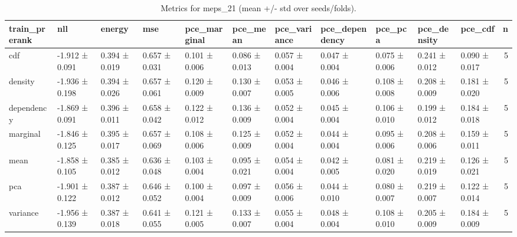 \begin{table}
\caption{Metrics for meps_21 (mean +/- std over seeds/folds).}
\label{tab:metrics_summary_meps_21}
\begin{tabular}{lllllllllllr}
\toprule
train_prerank & nll & energy & mse & pce_marginal & pce_mean & pce_variance & pce_dependency & pce_pca & pce_density & pce_cdf & n \\
\midrule
cdf & -1.912 ± 0.091 & 0.394 ± 0.019 & 0.657 ± 0.031 & 0.101 ± 0.006 & 0.086 ± 0.013 & 0.057 ± 0.004 & 0.047 ± 0.004 & 0.075 ± 0.006 & 0.241 ± 0.012 & 0.090 ± 0.017 & 5 \\
density & -1.936 ± 0.198 & 0.394 ± 0.026 & 0.657 ± 0.061 & 0.120 ± 0.009 & 0.130 ± 0.007 & 0.053 ± 0.005 & 0.046 ± 0.006 & 0.108 ± 0.008 & 0.208 ± 0.009 & 0.181 ± 0.020 & 5 \\
dependency & -1.869 ± 0.091 & 0.396 ± 0.011 & 0.658 ± 0.042 & 0.122 ± 0.012 & 0.136 ± 0.009 & 0.052 ± 0.004 & 0.045 ± 0.004 & 0.106 ± 0.010 & 0.199 ± 0.012 & 0.184 ± 0.018 & 5 \\
marginal & -1.846 ± 0.125 & 0.395 ± 0.017 & 0.657 ± 0.069 & 0.108 ± 0.006 & 0.125 ± 0.009 & 0.052 ± 0.004 & 0.044 ± 0.004 & 0.095 ± 0.006 & 0.208 ± 0.006 & 0.159 ± 0.011 & 5 \\
mean & -1.858 ± 0.105 & 0.385 ± 0.012 & 0.636 ± 0.048 & 0.103 ± 0.004 & 0.095 ± 0.021 & 0.054 ± 0.004 & 0.042 ± 0.005 & 0.081 ± 0.020 & 0.219 ± 0.019 & 0.126 ± 0.021 & 5 \\
pca & -1.901 ± 0.122 & 0.387 ± 0.012 & 0.646 ± 0.052 & 0.100 ± 0.004 & 0.097 ± 0.009 & 0.056 ± 0.006 & 0.044 ± 0.010 & 0.080 ± 0.007 & 0.219 ± 0.007 & 0.122 ± 0.014 & 5 \\
variance & -1.956 ± 0.139 & 0.387 ± 0.018 & 0.641 ± 0.055 & 0.121 ± 0.005 & 0.133 ± 0.007 & 0.055 ± 0.004 & 0.048 ± 0.004 & 0.108 ± 0.010 & 0.205 ± 0.009 & 0.184 ± 0.009 & 5 \\
\bottomrule
\end{tabular}
\end{table}

